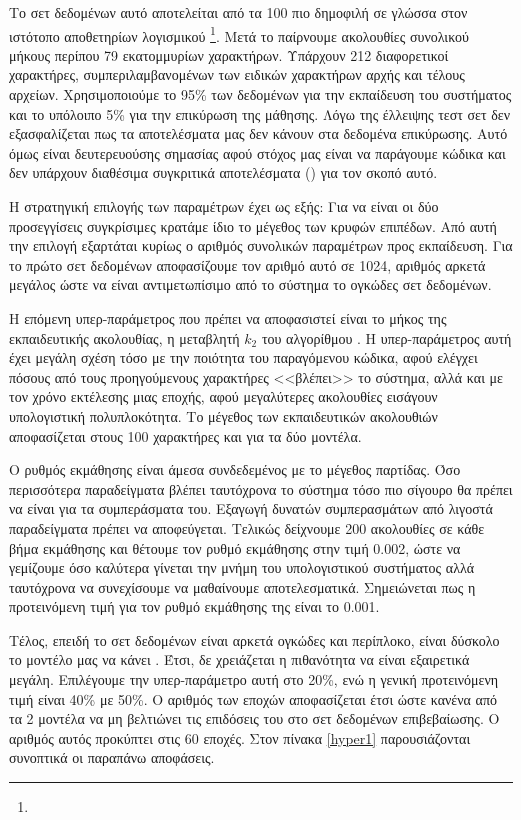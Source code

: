 Το σετ δεδομένων αυτό αποτελείται από τα 100 πιο δημοφιλή  σε γλώσσα  στον ιστότοπο αποθετηρίων λογισμικού \footnote{}.
Μετά το  παίρνουμε ακολουθίες συνολικού μήκους περίπου 79 εκατομμυρίων χαρακτήρων.
Υπάρχουν 212 διαφορετικοί χαρακτήρες, συμπεριλαμβανομένων των ειδικών χαρακτήρων αρχής και τέλους αρχείων.
Χρησιμοποιούμε το 95\% των δεδομένων για την εκπαίδευση του συστήματος και το υπόλοιπο 5\% για την επικύρωση της μάθησης.
Λόγω της έλλειψης τεστ σετ δεν εξασφαλίζεται πως τα αποτελέσματα μας δεν κάνουν  στα δεδομένα επικύρωσης. Αυτό όμως είναι δευτερευούσης σημασίας αφού στόχος μας είναι να παράγουμε κώδικα και δεν υπάρχουν διαθέσιμα συγκριτικά αποτελέσματα () για τον σκοπό αυτό.

Η στρατηγική επιλογής των παραμέτρων έχει ως εξής: Για να είναι οι δύο προσεγγίσεις συγκρίσιμες κρατάμε ίδιο το μέγεθος των κρυφών επιπέδων.
Από αυτή την επιλογή εξαρτάται κυρίως ο αριθμός συνολικών παραμέτρων προς εκπαίδευση.
Για το πρώτο σετ δεδομένων αποφασίζουμε τον αριθμό αυτό σε 1024, αριθμός αρκετά μεγάλος ώστε να είναι αντιμετωπίσιμο από το σύστημα το ογκώδες σετ δεδομένων.

Η επόμενη υπερ-παράμετρος που πρέπει να αποφασιστεί είναι το μήκος της εκπαιδευτικής ακολουθίας, η μεταβλητή $k_2$ του αλγορίθμου .
Η υπερ-παράμετρος αυτή έχει μεγάλη σχέση τόσο με την ποιότητα του παραγόμενου κώδικα, αφού ελέγχει πόσους από τους προηγούμενους χαρακτήρες <<βλέπει>> το σύστημα, αλλά και με τον χρόνο εκτέλεσης μιας εποχής, αφού μεγαλύτερες ακολουθίες εισάγουν υπολογιστική πολυπλοκότητα.
Το μέγεθος των εκπαιδευτικών ακολουθιών αποφασίζεται στους 100 χαρακτήρες και για τα δύο μοντέλα.

Ο ρυθμός εκμάθησης είναι άμεσα συνδεδεμένος με το μέγεθος παρτίδας.
Όσο περισσότερα παραδείγματα βλέπει ταυτόχρονα το σύστημα τόσο πιο σίγουρο θα πρέπει να είναι για τα συμπεράσματα του.
Εξαγωγή δυνατών συμπερασμάτων από λιγοστά παραδείγματα πρέπει να αποφεύγεται.
Τελικώς δείχνουμε 200 ακολουθίες σε κάθε βήμα εκμάθησης και θέτουμε τον ρυθμό εκμάθησης στην τιμή 0.002, ώστε να γεμίζουμε όσο καλύτερα γίνεται την μνήμη του υπολογιστικού συστήματος αλλά ταυτόχρονα να συνεχίσουμε να μαθαίνουμε αποτελεσματικά.
Σημειώνεται πως η προτεινόμενη τιμή για τον ρυθμό εκμάθησης της  είναι το 0.001.

Τέλος, επειδή το σετ δεδομένων  είναι αρκετά ογκώδες και περίπλοκο, είναι δύσκολο το μοντέλο μας να κάνει . Έτσι, δε χρειάζεται η πιθανότητα  να είναι εξαιρετικά μεγάλη.
Επιλέγουμε την υπερ-παράμετρο αυτή στο 20\%, ενώ η γενική προτεινόμενη τιμή είναι 40\% με 50\%.
Ο αριθμός των εποχών αποφασίζεται έτσι ώστε κανένα από τα 2 μοντέλα να μη βελτιώνει τις επιδόσεις του στο σετ δεδομένων επιβεβαίωσης.
Ο αριθμός αυτός προκύπτει στις 60 εποχές.
Στον πίνακα \ref{hyper1} παρουσιάζονται συνοπτικά οι παραπάνω αποφάσεις.

